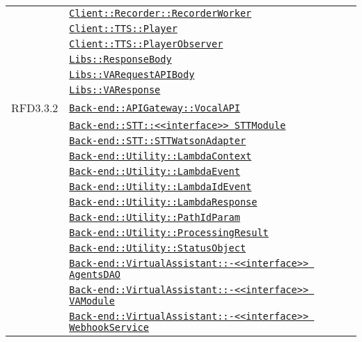 \begin{longtable}{|>{\centering}m{3cm}|m{10cm}<{\centering}|}
& \hyperref[Client::Recorder::RecorderWorker]{\texttt{Client::Recorder::RecorderWorker}}\\
& \hyperref[Client::TTS::Player]{\texttt{Client::TTS::Player}}\\
& \hyperref[Client::TTS::PlayerObserver]{\texttt{Client::TTS::PlayerObserver}}\\
& \hyperref[Libs::ResponseBody]{\texttt{Libs::ResponseBody}}\\
& \hyperref[Libs::VARequestAPIBody]{\texttt{Libs::VARequestAPIBody}}\\
& \hyperref[Libs::VAResponse]{\texttt{Libs::VAResponse}}\\ \hline

RFD3.3.2 & \hyperref[Back-end::APIGateway::VocalAPI]{\texttt{Back-end::APIGateway::VocalAPI}}\\
& \hyperref[Back-end::STT::<<interface>> STTModule]{\texttt{Back-end::STT::<<interface>> STTModule}}\\
& \hyperref[Back-end::STT::STTWatsonAdapter]{\texttt{Back-end::STT::STTWatsonAdapter}}\\
& \hyperref[Back-end::Utility::LambdaContext]{\texttt{Back-end::Utility::LambdaContext}}\\
& \hyperref[Back-end::Utility::LambdaEvent]{\texttt{Back-end::Utility::LambdaEvent}}\\
& \hyperref[Back-end::Utility::LambdaIdEvent]{\texttt{Back-end::Utility::LambdaIdEvent}}\\
& \hyperref[Back-end::Utility::LambdaResponse]{\texttt{Back-end::Utility::LambdaResponse}}\\
& \hyperref[Back-end::Utility::PathIdParam]{\texttt{Back-end::Utility::PathIdParam}}\\
& \hyperref[Back-end::Utility::ProcessingResult]{\texttt{Back-end::Utility::ProcessingResult}}\\
& \hyperref[Back-end::Utility::StatusObject]{\texttt{Back-end::Utility::StatusObject}}\\
& \hyperref[Back-end::VirtualAssistant::<<interface>> AgentsDAO]{\texttt{Back-end::VirtualAssistant::-\linebreak <<interface>> AgentsDAO}}\\
& \hyperref[Back-end::VirtualAssistant::<<interface>> VAModule]{\texttt{Back-end::VirtualAssistant::-\linebreak <<interface>> VAModule}}\\
& \hyperref[Back-end::VirtualAssistant::<<interface>> WebhookService]{\texttt{Back-end::VirtualAssistant::-\linebreak <<interface>> WebhookService}}\\

\end{longtable}
